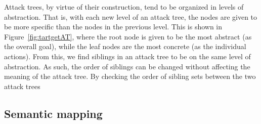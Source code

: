 Attack trees, by virtue of their construction, tend to be organized in levels of abstraction. That is, with each new level of an attack tree, the nodes are given to be more specific than the nodes in the previous level. This is shown in Figure~\ref{fig:tartgetAT}, where the root node is given to be the most abstract (as the overall goal), while the leaf nodes are the most concrete (as the individual actions). From this, we find siblings in an attack tree to be on the same level of abstraction. As such, the order of siblings can be changed without affecting the meaning of the attack tree. By checking the order of sibling sets between the two attack trees




\subsection{Semantic mapping}



